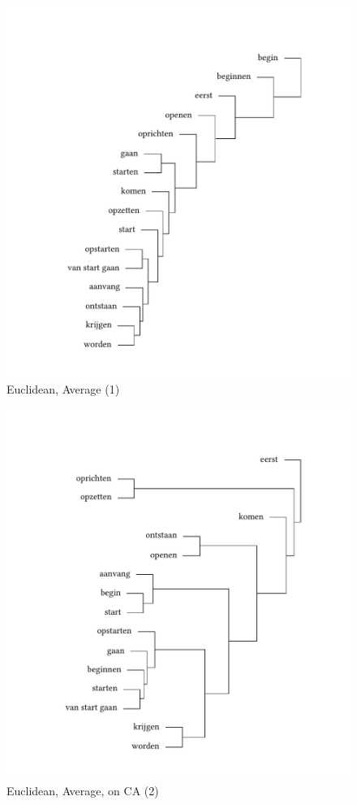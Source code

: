 \begin{figure}
\includegraphics[height=.4\textheight]{figures/tree30.pdf}
\caption{\label{fig:3:30} Euclidean, Average (1)}
\end{figure}

\begin{figure}
\includegraphics[height=.4\textheight]{figures/tree31.pdf}
\caption{\label{fig:3:31}  Euclidean, Average, on CA (2)}
\end{figure}

